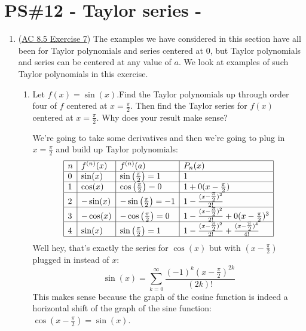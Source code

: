 


%


\allowdisplaybreaks
\section{PS\#12 - Taylor series -  }

\everymath{\displaystyle}
\begin{enumerate}[leftmargin=0pt]

\item (\href{https://activecalculus.org/single/sec-8-5-taylor.html#GLb}{AC 8.5 Exercise 7}) The examples we have considered in this section have all been for Taylor polynomials and series centered at $0$, but Taylor polynomials and series can be centered at any value of $a$. We look at examples of such Taylor polynomials in this exercise.
\begin{enumerate}
    \item Let $f(x) = \sin(x)$.Find the Taylor polynomials up through order four of $f$ centered at $x=\tfrac\pi2$. Then find the Taylor series for $f(x)$ centered at $x=\tfrac\pi2$. Why does your result make sense?
    
    \begin{red}
    We're going to take some derivatives and then we're going to plug in $x=\tfrac\pi2$ and build up Taylor polynomials:
    \[\begin{array}{|l|l|l|l|}
    \hline
    n & f^{(n)}(x) & f^{(n)}(a)             & P_n(x)                        \\ \hline
    0 & \sin(x)    & \sin\left(\frac\pi2\right) = 1   & 1                             \\ \hline
    1 & \cos(x)    & \cos\left(\frac\pi2\right) = 0   & 1 + 0 (x-\tfrac\pi2)                  \\ \hline
    2 & -\sin(x)   & -\sin\left(\frac\pi2\right) = -1 & 1-\frac{(x-\tfrac\pi2)^2}{2!} \\ \hline
    3 & -\cos(x)   & -\cos\left(\frac\pi2\right) = 0  & 1-\frac{(x-\tfrac\pi2)^2}{2!} + 0(x-\tfrac\pi2)^3 \\ \hline
    4 & \sin(x)    & \sin\left(\frac\pi2\right) = 1  & 1-\frac{(x-\tfrac\pi2)^2}{2!}+\frac{(x-\tfrac\pi2)^4}{4!} \\ \hline
    \end{array}\]
    Well hey, that's exactly the series for $\cos(x)$ but with $(x-\tfrac\pi2)$ plugged in instead of $x$:
    \[\sin(x) = \sum_{k=0}^{\infty} \frac{(-1)^k (x-\tfrac\pi2)^{2k}}{(2k)!}\]
    This makes sense because the graph of the cosine function is indeed a horizontal shift of the graph of the sine function: $\cos\left(x-\frac\pi2\right) = \sin(x)$.
    

\end{red}
\end{enumerate}
\end{enumerate}
